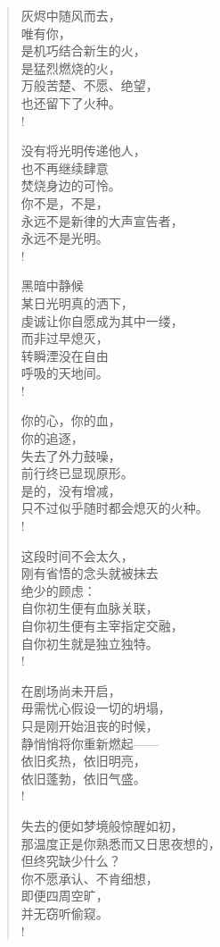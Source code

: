 \documentclass[UTF8, 12pt, a4paper]{ctexrep} %
\begin{document}
\begin{verse}
    灰烬中随风而去，\\
    唯有你，\\
    是机巧结合新生的火，\\
    是猛烈燃烧的火，\\
    万般苦楚、不愿、绝望，\\
    也还留下了火种。\\!

    没有将光明传递他人，\\
    也不再继续肆意\\
    焚烧身边的可怜。\\
    你不是，不是，\\
    永远不是新律的大声宣告者，\\
    永远不是光明。\\!

    黑暗中静候\\
    某日光明真的洒下，\\
    虔诚让你自愿成为其中一缕，\\
    而非过早熄灭，\\
    转瞬湮没在自由\\
    呼吸的天地间。\\!

    你的心，你的血，\\
    你的追逐，\\
    失去了外力鼓噪，\\
    前行终已显现原形。\\
    是的，没有增减，\\
    只不过似乎随时都会熄灭的火种。\\!

    这段时间不会太久，\\
    刚有省悟的念头就被抹去\\
    绝少的顾虑：\\
    自你初生便有血脉关联，\\
    自你初生便有主宰指定交融，\\
    自你初生就是独立独特。\\!

    在剧场尚未开启，\\
    毋需忧心假设一切的坍塌，\\
    只是刚开始沮丧的时候，\\
    静悄悄将你重新燃起——\\
    依旧炙热，依旧明亮，\\
    依旧蓬勃，依旧气盛。\\!

    失去的便如梦境般惊醒如初，\\
    那温度正是你熟悉而又日思夜想的，\\
    但终究缺少什么？\\
    你不愿承认、不肯细想，\\
    即便四周空旷，\\
    并无窃听偷窥。\\!


\end{verse}
\end{document}
